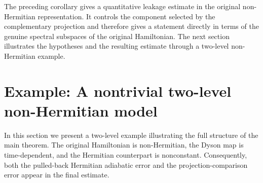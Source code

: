\documentclass[pdflatex,sn-mathphys-num]{sn-jnl}
\theoremstyle{thmstyleone}
\theoremstyle{thmstyletwo}
\theoremstyle{thmstylethree}
\begin{document}
The preceding corollary gives a quantitative leakage estimate in the original
non-Hermitian representation. It controls the component selected by the
complementary projection and therefore gives a statement directly in terms of
the genuine spectral subspaces of the original Hamiltonian. The next section
illustrates the hypotheses and the resulting estimate through a two-level
non-Hermitian example.

\section{Example: A nontrivial two-level non-Hermitian model}

In this section we present a two-level example illustrating the full structure of
the main theorem. The original Hamiltonian is non-Hermitian, the Dyson map is
time-dependent, and the Hermitian counterpart is nonconstant. Consequently, both
the pulled-back Hermitian adiabatic error and the projection-comparison error
appear in the final estimate.
\end{document}
